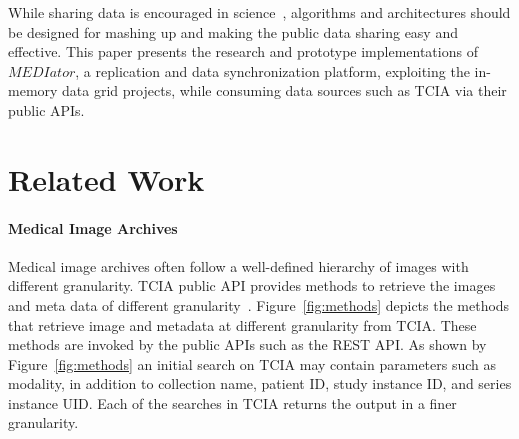 \documentclass[conference]{IEEEtran}
\begin{document}
While sharing data is encouraged in science~\cite{szala2006science}, algorithms and architectures should be designed for mashing up and making the public data sharing easy and effective. This paper presents the research and prototype implementations of $MEDIator$, a replication and data synchronization platform, exploiting the in-memory data grid projects, while consuming data sources such as TCIA via their public APIs.

%
\section{Related Work}
\paragraph*{\textbf{Medical Image Archives}}

Medical image archives often follow a well-defined hierarchy of images with different granularity. TCIA public API provides methods to retrieve the images and meta data of different granularity~\cite{prior2013tcia}. Figure~\ref{fig:methods} depicts the methods that retrieve image and metadata at different granularity from TCIA. These methods are invoked by the public APIs such as the REST API. As shown by Figure~\ref{fig:methods} an initial search on TCIA may contain parameters such as modality, in addition to collection name, patient ID, study instance ID, and series instance UID. Each of the searches in TCIA returns the output in a finer granularity.
\end{document}
